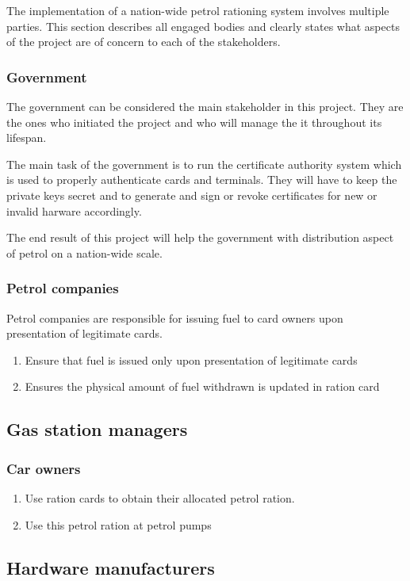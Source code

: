 The implementation of a nation-wide petrol rationing system involves multiple parties. This section describes all engaged bodies and clearly states what aspects of the project are of concern to each of the stakeholders.

\subsubsection{Government}

The government can be considered the main stakeholder in this project. They are the ones who initiated the project and who will manage the it throughout its lifespan.

The main task of the government is to run the certificate authority system which is used to properly authenticate cards and terminals. They will have to keep the private keys secret and to generate and sign or revoke certificates for new or invalid harware accordingly.

The end result of this project will help the government with distribution aspect of petrol on a nation-wide scale.

\subsubsection{Petrol companies}

Petrol companies are responsible for issuing fuel to card owners upon presentation of legitimate cards.
\begin{enumerate}
  \item Ensure that fuel is issued only upon presentation of legitimate cards
  \item Ensures the physical amount of fuel withdrawn is updated in ration card
\end{enumerate}

\subsection{Gas station managers}

\subsubsection{Car owners}
\begin{enumerate}
  \item Use ration cards to obtain their allocated petrol ration. 
  \item Use this petrol ration at petrol pumps
\end{enumerate}

\subsection{Hardware manufacturers}



